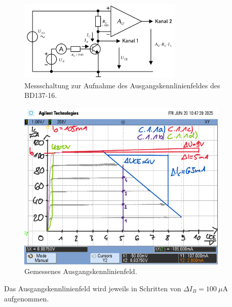 \documentclass[
	a4paper, %
	12pt, %
]{CSUniSchoolLabReport}
\newcommand{\micro}{\ensuremath{\mu}}
\begin{document}
\begin{figure}[h]
	\centering
	\includegraphics[width=0.7\textwidth]{Figures/MessschaltungAusgangskennlinienfeld.png}
	\caption{Messschaltung zur Aufnahme des Ausgangskennlinienfeldes des BD137-16.}
	\label{fig:MessschaltungAusgangskennlinienfeld}
\end{figure}
\begin{figure}[h]
	\centering
	\includegraphics[width=0.9\textwidth]{Figures/Ausgangskennlinienfeld.png}
	\caption{Gemessenes Ausgangskennlinienfeld.}
	\label{fig:Ausgangskennlinienfeld}
\end{figure}

Das Ausgangskennlinienfeld wird jeweils in Schritten von $\Delta I_B = \SI{100}{\micro\ampere}$ aufgenommen.

\end{document}
